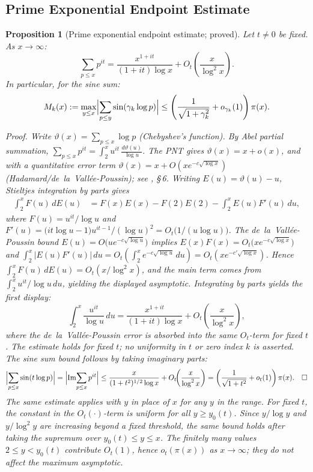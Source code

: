 \documentclass[11pt]{article}
\newtheorem{proposition}[theorem]{Proposition}
\begin{document}
\subsection{Prime Exponential Endpoint Estimate}

\begin{proposition}[Prime exponential endpoint estimate; proved]\label{thm:EXPLICIT}
Let $t\ne 0$ be fixed. As $x\to\infty$:
\[
\sum_{p\le x}p^{it}
= \frac{x^{1+it}}{(1+it)\log x}
  + O_t\!\left(\frac{x}{\log^2 x}\right).
\]
In particular, for the sine sum:
\[
M_k(x) := \max_{y\le x}\Bigl|\sum_{p\le y}\sin(\gamma_k\log p)\Bigr|
\le \left(\frac{1}{\sqrt{1+\gamma_k^2}}+o_{\gamma_k}(1)\right)\pi(x).
\]

\emph{Proof.}
Write $\vartheta(x)=\sum_{p\le x}\log p$ (Chebyshev's function).
By Abel partial summation, $\sum_{p\le x}p^{it}
= \int_2^x u^{it}\,\frac{d\vartheta(u)}{\log u}$.
The PNT gives $\vartheta(x)=x+o(x)$, and with a quantitative
error term $\vartheta(x)=x+O(xe^{-c\sqrt{\log x}})$
(Hadamard/de~la~Vall\'ee-Poussin); see \cite{IwaniecKowalski}, \S\,6.
Writing $E(u)=\vartheta(u)-u$, Stieltjes integration by parts gives
\begin{align*}
\int_2^x F(u)\,dE(u)
&= F(x)E(x) - F(2)E(2)
  - \int_2^x E(u)F'(u)\,du,
\end{align*}
where $F(u)=u^{it}/\log u$ and
$F'(u)=\bigl(it\log u - 1\bigr)u^{it-1}/(\log u)^2
       = O_t\bigl(1/(u\log u)\bigr)$.
The de~la~Vall\'ee-Poussin bound
$E(u)=O\bigl(ue^{-c\sqrt{\log u}}\bigr)$ implies
$E(x)F(x)=O_t\bigl(xe^{-c\sqrt{\log x}}\bigr)$
and
$\int_2^x |E(u)F'(u)|\,du
 = O_t\!\left(\int_2^x e^{-c\sqrt{\log u}}\,du\right)
 = O_t\!\left(xe^{-c'\sqrt{\log x}}\right)$.
Hence $\int_2^x F(u)\,dE(u)=O_t(x/\log^2 x)$,
and the main term comes from
$\int_2^x u^{it}/\log u\,du$,
yielding the displayed asymptotic.
Integrating by parts yields the first display:
\[
\int_2^x \frac{u^{it}}{\log u}\,du
= \frac{x^{1+it}}{(1+it)\log x}
  + O_t\!\left(\frac{x}{\log^2 x}\right),
\]
where the de~la~Vall\'ee-Poussin error is absorbed into the
same $O_t$-term for fixed $t$.
The estimate holds for fixed $t$; no uniformity in $t$ or zero index $k$
is asserted.
The sine sum bound follows by taking imaginary parts:
\[
\Bigl|\sum_{p\le x}\sin(t\log p)\Bigr|
= \Bigl|\operatorname{Im}\!\sum_{p\le x}p^{it}\Bigr|
\le \frac{x}{(1+t^2)^{1/2}\log x} + O_t\!\!\left(\frac{x}{\log^2 x}\right)
= \left(\frac{1}{\sqrt{1+t^2}}+o_t(1)\right)\pi(x). \quad\square
\]
The same estimate applies with $y$ in place of $x$ for any $y$ in the range.
For fixed $t$, the constant in the $O_t(\cdot)$-term is uniform
for all $y\ge y_0(t)$. Since $y/\log y$ and $y/\log^2 y$ are
increasing beyond a fixed threshold, the same bound holds after
taking the supremum over $y_0(t)\le y\le x$.
The finitely many values $2\le y < y_0(t)$ contribute $O_t(1)$,
hence $o_t(\pi(x))$ as $x\to\infty$; they do not affect the
maximum asymptotic.
\end{proposition}
\end{document}
